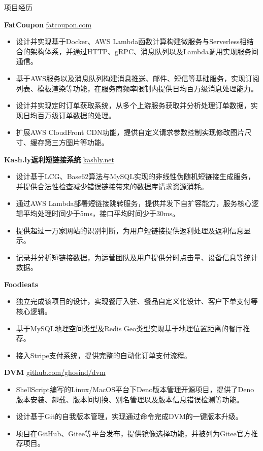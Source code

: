 \documentclass{resume} %
\begin{document}
\begin{rSection}{项目经历}
  \vspace{-1.25em}

  \item \textbf{FatCoupon} {} \hfill \href{www.fatcoupon.com}{fatcoupon.com}
  \begin{itemize}
    \itemsep -3pt {}
    \item 设计并实现基于Docker、AWS Lambda函数计算构建微服务与Serverless相结合的架构体系，并通过HTTP、gRPC、消息队列以及Lambda调用实现服务间通信。
    \item 基于AWS服务以及消息队列构建消息推送、邮件、短信等基础服务，实现订阅列表、模板渲染等功能，在服务商频率限制内提供日均百万级消息处理能力。
    \item 设计并实现定时订单获取系统，从多个上游服务获取并分析处理订单数据，实现日均百万级订单数据的处理。
    \item 扩展AWS CloudFront CDN功能，提供自定义请求参数控制实现修改图片尺寸、缓存第三方图片等功能。
  \end{itemize}

  \item \textbf{Kash.ly返利短链接系统} {} \hfill \href{kashly.net}{kashly.net}
  \begin{itemize}
    \itemsep -3pt {}
    \item 设计基于LCG、Base62算法与MySQL实现的非线性伪随机短链接生成服务，并提供合法性检查减少错误链接带来的数据库请求资源消耗。
    \item 通过AWS Lambda部署短链接跳转服务，提供并发下自扩容能力，服务核心逻辑平均处理时间少于5ms，接口平均时间少于30ms。
    \item 提供超过一万家网站的识别判断，为用户短链接提供返利处理及返利信息显示。
    \item 记录并分析短链接数据，为运营团队及用户提供分时点击量、设备信息等统计数据。
  \end{itemize}

  \item \textbf{Foodieats} {}
  \begin{itemize}
    \itemsep -3pt {}
    \item 独立完成该项目的设计，实现餐厅入驻、餐品自定义化设计、客户下单支付等核心逻辑。
    \item 基于MySQL地理空间类型及Redis Geo类型实现基于地理位置距离的餐厅推荐。
    \item 接入Stripe支付系统，提供完整的自动化订单支付流程。
  \end{itemize}

  \item \textbf{DVM} {} \hfill \href{https://github.com/ghosind/dvm}{github.com/ghosind/dvm}
  \begin{itemize}
    \itemsep -3pt {}
    \item ShellScript编写的Linux/MacOS平台下Deno版本管理开源项目，提供了Deno版本安装、卸载、版本间切换、别名管理以及版本信息错误检测等功能。
    \item 设计基于Git的自我版本管理，实现通过命令完成DVM的一键版本升级。
    \item 项目在GitHub、Gitee等平台发布，提供镜像选择功能，并被列为Gitee官方推荐项目。
  \end{itemize}

\end{rSection}
\end{document}
